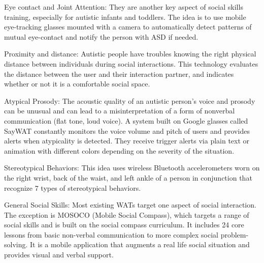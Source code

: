 Eye contact and Joint Attention: They are another key aspect of social skills training, especially for autistic infants and toddlers. The idea is to use mobile eye-tracking glasses mounted with a camera to automatically detect patterns of mutual eye-contact and notify the person with ASD if needed.

Proximity and distance: Autistic people have troubles knowing the right physical distance between individuals during social interactions. This technology evaluates the distance between the user and their interaction partner, and indicates whether or not it is a comfortable social space.

Atypical Prosody: The acoustic quality of an autistic person’s voice and prosody can be unusual and can lead to a misinterpretation of a form of nonverbal communication (flat tone, loud voice). A system built on Google glasses called SayWAT constantly monitors the voice volume and pitch of users and provides alerts when atypicality is detected. They receive trigger alerts via plain text or animation with different colors depending on the severity of the situation.

Stereotypical Behaviors: This idea uses wireless Bluetooth accelerometers worn on the right wrist, back of the waist, and left ankle of a person in conjunction that recognize 7 types of stereotypical behaviors.

General Social Skills: Most existing WATs target one aspect of social interaction. The exception is MOSOCO (Mobile Social Compass), which targets a range of social skills and is built on the social compass curriculum. It includes 24 core lessons from basic non-verbal communication to more complex social problem-solving. It is a mobile application that augments a real life social situation and provides visual and verbal support.
